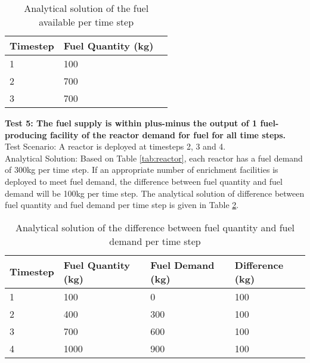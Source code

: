 \documentclass[12pt,letterpaper]{article}
\begin{document}
\begin{table}[H]
     \centering
    \begin{tabularx}{\textwidth}{bbb}
       \hline
       Timestep & Fuel Quantity (kg)  \\
       \hline
       1 & 100 \\
       2 & 700 \\
       3 & 700\\
       \hline
    \end{tabularx}
    \caption {Analytical solution of the fuel available per time step}
    \label{tab:test-fueldemand}
\end{table}

\noindent
\textbf{Test 5: The fuel supply is within plus-minus the output of 1 fuel-producing facility of the reactor demand for fuel for all time steps.} \\
Test Scenario: A reactor is deployed at timesteps 2, 3 and 4.\\
Analytical Solution: Based on Table \ref{tab:reactor}, each reactor has a fuel demand of 300kg per time step. If an appropriate number of enrichment facilities is deployed to meet fuel demand, the difference between fuel quantity and fuel demand will be 100kg per time step. The analytical solution of difference between fuel quantity and fuel demand per time step is given in Table \ref{tab:test-fueldiff}.  

\begin{table}[H]
     \centering
    \begin{tabularx}{\textwidth}{bbbb}
       \hline
       Timestep & Fuel Quantity (kg) & Fuel Demand (kg) & Difference (kg)\\
       \hline
       1 & 100 & 0 &100\\
       2 & 400 & 300 &100\\
       3 & 700 & 600 &100\\
       4 & 1000 & 900 &100\\
       \hline
    \end{tabularx}
    \caption {Analytical solution of the difference between fuel quantity and fuel demand per time step}
    \label{tab:test-fueldiff}
\end{table}
\end{document}
